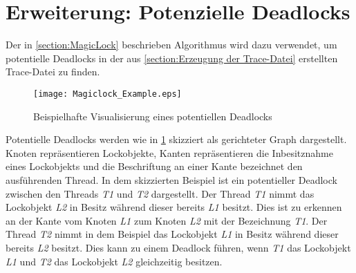 \section{Erweiterung: Potenzielle Deadlocks}
\label{section:Erweiterung: Potenzielle Deadlocks}
Der in \cref{section:MagicLock} beschrieben Algorithmus wird dazu verwendet, um
potentielle Deadlocks in der aus \cref{section:Erzeugung der Trace-Datei}
erstellten Trace-Datei zu finden. 

\begin{figure}[ht]
  \texttt{[image: Magiclock\_Example.eps]}
  \caption{Beispielhafte Visualisierung eines potentiellen Deadlocks}
  \label{fig:Magiclock_Example}
\end{figure}

Potentielle Deadlocks werden wie in \cref{fig:Magiclock_Example} skizziert als
gerichteter Graph dargestellt. Knoten repräsentieren Lockobjekte, Kanten
repräsentieren die Inbesitznahme eines Lockobjekts und die Beschriftung an einer
Kante bezeichnet den ausführenden Thread. In dem skizzierten Beispiel ist ein
potentieller Deadlock zwischen den Threads \textit{T1} und \textit{T2}
dargestellt. Der Thread \textit{T1} nimmt das Lockobjekt \textit{L2} in Besitz
während dieser bereits \textit{L1} besitzt. Dies ist zu erkennen an der Kante
vom Knoten \textit{L1} zum Knoten \textit{L2} mit der Bezeichnung \textit{T1}.
Der Thread \textit{T2} nimmt in dem Beispiel das Lockobjekt \textit{L1} in
Besitz während dieser bereits \textit{L2} besitzt. Dies kann zu einem Deadlock
führen, wenn \textit{T1} das Lockobjekt \textit{L1} und \textit{T2} das
Lockobjekt \textit{L2} gleichzeitig besitzen.